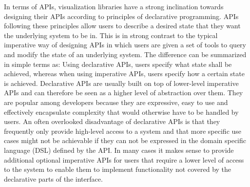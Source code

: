 In terms of APIs, visualization libraries have a strong inclination towards designing their APIs according to principles of declarative programming. APIs following these principles allow users to describe a desired state that they want the underlying system to be in. This is in strong contrast to the typical imperative way of designing APIs in which users are given a set of tools to query and modify the state of an underlying system. The difference can be summarized in simple terms as: Using declarative APIs, users specify what state shall be achieved, whereas when using imperative APIs, users specify how a certain state is achieved. Declarative APIs are usually built on top of lower-level imperative APIs and can therefore be seen as a higher level of abstraction over them. They are popular among developers because they are expressive, easy to use and effectively encapsulate complexity that would otherwise have to be handled by users. An often overlooked disadvantage of declarative APIs is that they frequently only provide high-level access to a system and that more specific use cases might not be achievable if they can not be expressed in the domain specific language (DSL) defined by the API. In many cases it makes sense to provide additional optional imperative APIs for users that require a lower level of access to the system to enable them to implement functionality not covered by the declarative parts of the interface.

